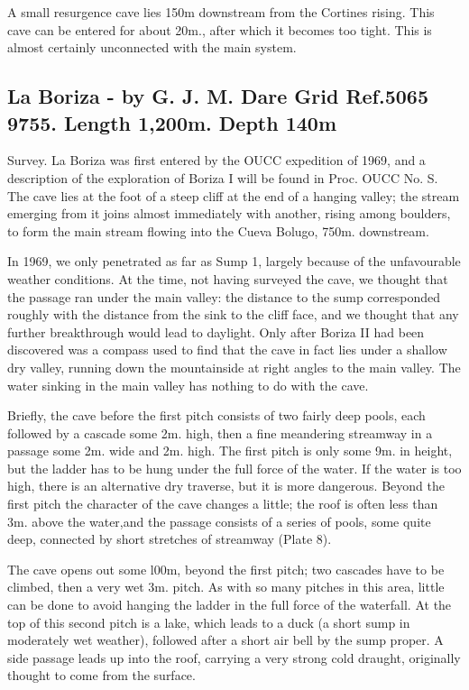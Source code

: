 \documentclass[11pt, a4paper, twoside]{memoir}
\begin{document}
A small resurgence cave lies 150m downstream from the Cortines rising. This cave can be entered for about 20m., after which it becomes too tight. This is almost certainly unconnected with the main system.



\subsection*{La Boriza - by G. J. M. Dare Grid Ref.5065 9755. Length 1,200m. Depth 140m}

Survey. La Boriza was first entered by the OUCC expedition of 1969, and a description of the exploration of Boriza I will be found in Proc. OUCC No. S. The cave lies at the foot of a steep cliff at the end of a hanging valley; the stream emerging from it joins almost immediately with another, rising among boulders, to form the main stream flowing into the Cueva Bolugo, 750m. downstream.

In 1969, we only penetrated as far as Sump 1, largely because of the unfavourable weather conditions. At the time, not having surveyed the cave, we thought that the passage ran under the main valley: the distance to the sump corresponded roughly with the distance from the sink to the cliff face, and we thought that any further breakthrough would lead to daylight. Only after Boriza II had been discovered was a compass used to find that the cave in fact lies under a shallow dry valley, running down the mountainside at right angles to the main valley. The water sinking in the main valley has nothing to do with the cave.

Briefly, the cave before the first pitch consists of two fairly deep pools, each followed by a cascade some 2m. high, then a fine meandering streamway in a passage some 2m. wide and 2m. high. The first pitch is only some 9m. in height, but the ladder has to be hung under the full force of the water. If the water is too high, there is an alternative dry traverse, but it is more dangerous. Beyond the first pitch the character of the cave changes a little; the roof is often less than 3m. above the water,and the passage consists of a series of pools, some quite deep, connected by short stretches of streamway (Plate 8).

The cave opens out some l00m, beyond the first pitch; two cascades have to be climbed, then a very wet 3m. pitch. As with so many pitches in this area, little can be done to avoid hanging the ladder in the full force of the waterfall. At the top of this second pitch is a lake, which leads to a duck (a short sump in moderately wet weather), followed after a short air bell by the sump proper. A side passage leads up into the roof, carrying a very strong cold draught, originally thought to come from the surface.
\end{document}
